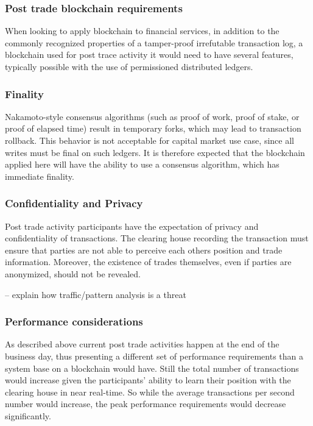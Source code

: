 \subsubsection{Post trade blockchain requirements}

When looking to apply blockchain to financial services, in addition to the commonly recognized properties of a tamper-proof irrefutable transaction log, a blockchain used for post trace activity it would need to have several features, typically possible with the use of permissioned distributed ledgers.

\subsubsection{Finality}

Nakamoto-style consensus algorithms (such as proof of work, proof of stake, or proof of elapsed time) result in temporary forks, which may lead to transaction rollback. This behavior is not acceptable for capital market use case, since all writes must be final on such ledgers. It is therefore expected that the blockchain applied here will have the ability to use a consensus algorithm, which has immediate finality.

\subsubsection{Confidentiality and Privacy}

Post trade activity participants have the expectation of privacy and confidentiality of transactions. The clearing house recording the transaction must ensure that parties are not able to perceive each others position and trade information. Moreover, the existence of trades themselves, even if parties are anonymized, should not be revealed.

-- explain how traffic/pattern analysis is a threat

\subsubsection{Performance considerations}

As described above current post trade activities happen at the end of the business day, thus presenting a different set of performance requirements than a system base on a blockchain would have. Still the total number of transactions would increase given the participants' ability to learn their position with the clearing house in near real-time. So while the average transactions per second number would increase, the peak performance requirements would decrease significantly.


